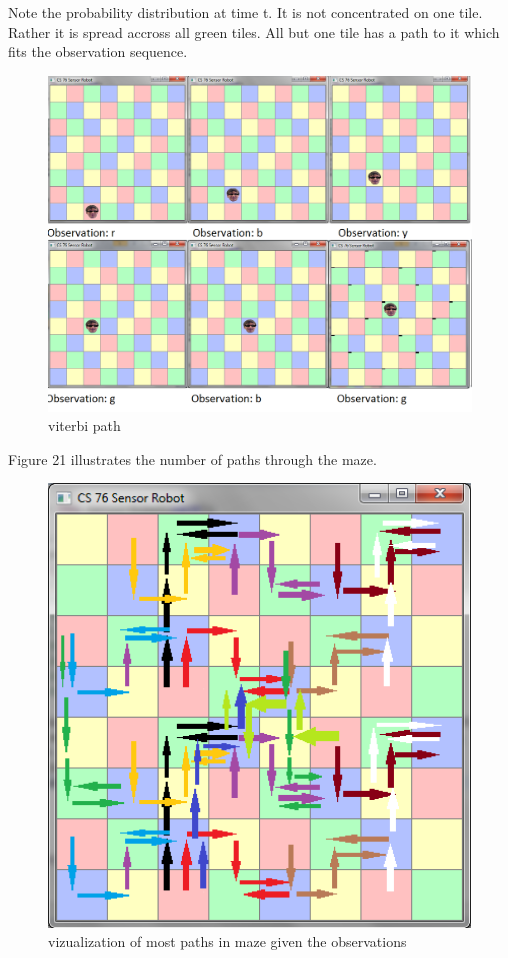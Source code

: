 \documentclass[a4paper]{article}
\begin{document}
Note the probability distribution at time t. It is not concentrated on one tile. Rather it is spread accross all green tiles. All but one tile has a path to it which fits the observation sequence.

\begin{figure}[H]
\centering
\includegraphics[width=1.2\textwidth]{10x10ViterbiAmbiguous.png}
\caption{\label{fig:2x2 maze}viterbi path}
\end{figure}

Figure 21 illustrates the number of paths through the maze. 

\begin{figure}[H]
\centering
\includegraphics[width=1\textwidth]{Paths.png}
\caption{\label{fig:2x2 maze}vizualization of most paths in maze given the observations}
\end{figure}
\end{document}
